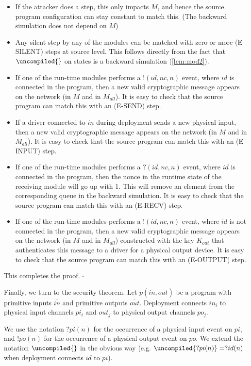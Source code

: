 \begin{itemize}
\item If the attacker does a step, this only impacts $M$, and hence the source program configuration can stay constant to match this. (The backward simulation does not depend on $M$)
\item Any silent step by any of the modules can be matched with zero or
more (E-SILENT) steps at source level. This follows directly from the fact
that $\uncompiled{}$ on \protmod{} states is a backward simulation (\cref{lem:mod2}).
\item If one of the run-time modules performs a $!(id,nc,n)$ event, where $id $ is connected in the program, then a new valid cryptographic message appears on the network (in $M$ and in $M_{all}$). It is easy to check that the source program can match this with an (E-SEND) step.
\item If a driver \protmod{} connected to $in$ during deployment sends a new physical input,  then a new valid cryptographic message appears on the network (in $M$ and in $M_{all}$). It is easy to check that the source program can match this with an (E-INPUT) step.
\item If one of the run-time modules performs a $?(id,nc,n)$ event, where $id $ is connected in the program, then the nonce in the runtime state of the receiving module will go up with 1.
This will remove an element from the corresponding queue in the backward simulation.
It is easy to check that the source program can match this with an (E-RECV) step. 
\item If one of the run-time modules performs a $!(id,nc,n)$ event, where
$id $ is not connected in the program, then a new valid cryptographic
message appears on the network (in $M$ and in $M_{all}$) constructed with
the key $K_{out}$ that authenticates this message to a driver \protmod{} for a physical output device.  It is easy to check that the source program can match this with an (E-OUTPUT) step.
\end{itemize}
This completes the proof. \hfill $\square$

Finally, we turn to the security theorem.
Let $p(\overline{in},\overline{out})$ be a program with primitive inputs $\overline{in}$ and primitive outputs $\overline{out}$. 
Deployment connects $in_i$ to physical
input channels $pi_i$ and
$out_j$ to physical output channels $po_j$. 

We use the notation $?pi(n)$ for the occurrence of a physical input event on $pi$, and $!po(n)$ for the
occurrence of a physical output event on $po$. We extend the notation $\uncompiled{ }$  in the obvious way (e.g. $\uncompiled{?pi(n)} = ?id(n)$ when deployment connects $id$ to $pi$).

